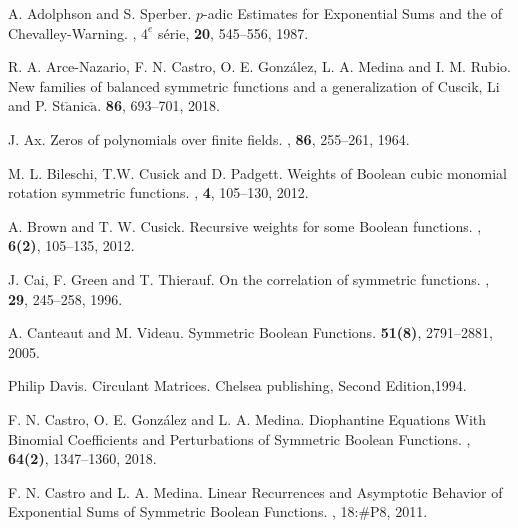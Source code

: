 

\begin{thebibliography}{1}



 A. Adolphson and S. Sperber. 
\newblock $p$-adic Estimates for Exponential Sums and the of Chevalley-Warning.
, $4^{e}$ s\'erie,  {\bf 20}, 545--556, 1987.

 R. A. Arce-Nazario, F. N. Castro, O. E. Gonz\'alez, L. A. Medina and I. M. Rubio.
\newblock New families of balanced symmetric functions and a generalization of Cuscik, Li and P. St$\check{\mbox{a}}$nic$\check{\mbox{a}}$.
 {\bf 86}, 693--701, 2018.

 J. Ax.
\newblock Zeros of polynomials over finite fields. 
, {\bf 86}, 255--261, 1964.

 M. L. Bileschi, T.W. Cusick and D. Padgett.
\newblock Weights of Boolean cubic monomial rotation symmetric functions.
, {\bf 4}, 105--130, 2012.

 A. Brown and T. W. Cusick.
\newblock Recursive weights for some Boolean functions. 
, {\bf 6(2)}, 105--135, 2012.

 J. Cai, F. Green and T. Thierauf. 
\newblock On the correlation of symmetric functions.
, {\bf 29}, 245--258, 1996.

 A. Canteaut and M. Videau.
\newblock Symmetric Boolean Functions.
 {\bf 51(8)}, 2791--2881, 2005.

\newblock Philip Davis. Circulant Matrices.
\newblock Chelsea publishing, Second Edition,1994.

 F. N. Castro, O. E. Gonz\'alez and L. A. Medina.
\newblock Diophantine Equations With Binomial Coefficients and Perturbations of Symmetric Boolean Functions.
, {\bf 64(2)}, 1347--1360, 2018.

 F. N. Castro and L. A. Medina. 
\newblock Linear Recurrences and Asymptotic Behavior of Exponential Sums of Symmetric Boolean Functions. 
, 18:\#P8, 2011.


\end{thebibliography}
